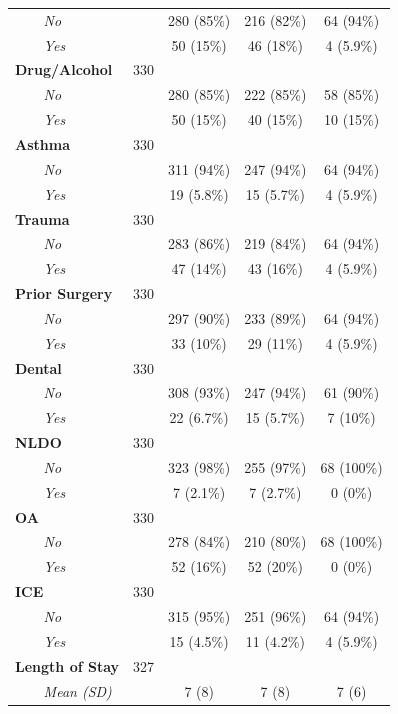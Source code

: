 \documentclass[
]{article}
\begin{document}
\begin{table}[t]
\begin{tabular*}{0.7\linewidth}{@{\extracolsep{\fill}}lcccc}
{\itshape     No} &  & 280 (85\%) & 216 (82\%) & 64 (94\%) \\ 
{\itshape     Yes} &  & 50 (15\%) & 46 (18\%) & 4 (5.9\%) \\ 
{\bfseries Drug/Alcohol} & 330 &  &  &  \\ 
{\itshape     No} &  & 280 (85\%) & 222 (85\%) & 58 (85\%) \\ 
{\itshape     Yes} &  & 50 (15\%) & 40 (15\%) & 10 (15\%) \\ 
{\bfseries Asthma} & 330 &  &  &  \\ 
{\itshape     No} &  & 311 (94\%) & 247 (94\%) & 64 (94\%) \\ 
{\itshape     Yes} &  & 19 (5.8\%) & 15 (5.7\%) & 4 (5.9\%) \\ 
{\bfseries Trauma} & 330 &  &  &  \\ 
{\itshape     No} &  & 283 (86\%) & 219 (84\%) & 64 (94\%) \\ 
{\itshape     Yes} &  & 47 (14\%) & 43 (16\%) & 4 (5.9\%) \\ 
{\bfseries Prior Surgery} & 330 &  &  &  \\ 
{\itshape     No} &  & 297 (90\%) & 233 (89\%) & 64 (94\%) \\ 
{\itshape     Yes} &  & 33 (10\%) & 29 (11\%) & 4 (5.9\%) \\ 
{\bfseries Dental} & 330 &  &  &  \\ 
{\itshape     No} &  & 308 (93\%) & 247 (94\%) & 61 (90\%) \\ 
{\itshape     Yes} &  & 22 (6.7\%) & 15 (5.7\%) & 7 (10\%) \\ 
{\bfseries NLDO} & 330 &  &  &  \\ 
{\itshape     No} &  & 323 (98\%) & 255 (97\%) & 68 (100\%) \\ 
{\itshape     Yes} &  & 7 (2.1\%) & 7 (2.7\%) & 0 (0\%) \\ 
{\bfseries OA} & 330 &  &  &  \\ 
{\itshape     No} &  & 278 (84\%) & 210 (80\%) & 68 (100\%) \\ 
{\itshape     Yes} &  & 52 (16\%) & 52 (20\%) & 0 (0\%) \\ 
{\bfseries ICE} & 330 &  &  &  \\ 
{\itshape     No} &  & 315 (95\%) & 251 (96\%) & 64 (94\%) \\ 
{\itshape     Yes} &  & 15 (4.5\%) & 11 (4.2\%) & 4 (5.9\%) \\ 
{\bfseries Length of Stay} & 327 &  &  &  \\ 
{\itshape     Mean (SD)} &  & 7 (8) & 7 (8) & 7 (6) \\ 

\end{tabular*}
\end{table}
\end{document}
